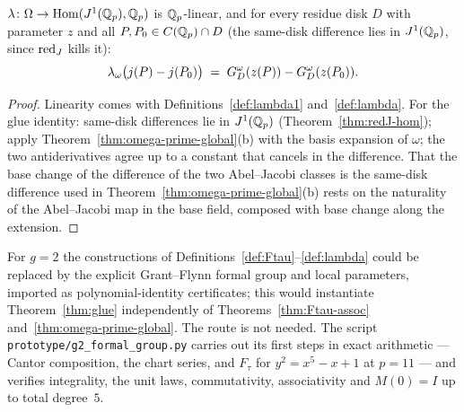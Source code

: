 \begin{theorem}
\label{thm:glue}
\leanok
{}
$\lambda \colon \Omega \to \operatorname{Hom}(J^1(\mathbb{Q}_p), \mathbb{Q}_p)$ is $\mathbb{Q}_p$-linear, and
for every residue disk $D$ with parameter $z$ and all $P, P_0 \in C(\mathbb{Q}_p) \cap D$ (the
same-disk difference lies in $J^1(\mathbb{Q}_p)$, since $\operatorname{red}_J$ kills it):
\[ \lambda_\omega\big(j(P) - j(P_0)\big) \;=\; G^{\omega}_D(z(P)) - G^{\omega}_D(z(P_0)). \]
\end{theorem}
\begin{proof}
\leanok
Linearity comes with Definitions~\ref{def:lambda1} and~\ref{def:lambda}. For the glue
identity: same-disk differences lie in $J^1(\mathbb{Q}_p)$ (Theorem~\ref{thm:redJ-hom}); apply
Theorem~\ref{thm:omega-prime-global}(b) with the basis expansion of $\omega$; the two
antiderivatives agree up to a constant that cancels in the difference. That the base
change of the difference of the two Abel--Jacobi classes is the same-disk difference
used in Theorem~\ref{thm:omega-prime-global}(b) rests on the naturality of the
Abel--Jacobi map in the base field, composed with base change along the extension.
\end{proof}

\begin{remark}
\label{rem:g2-cert}
For $g = 2$ the constructions of Definitions~\ref{def:Ftau}--\ref{def:lambda} could be
replaced by the explicit Grant--Flynn formal group and local parameters, imported as
polynomial-identity certificates; this would instantiate Theorem~\ref{thm:glue}
independently of Theorems~\ref{thm:Ftau-assoc} and~\ref{thm:omega-prime-global}. The
route is not needed. The script \texttt{prototype/g2\_formal\_group.py} carries out its
first steps in exact arithmetic --- Cantor composition, the chart series, and $F_\tau$ for
$y^2 = x^5 - x + 1$ at $p = 11$ --- and verifies integrality, the unit laws,
commutativity, associativity and $M(0) = I$ up to total degree~$5$.
\end{remark}
